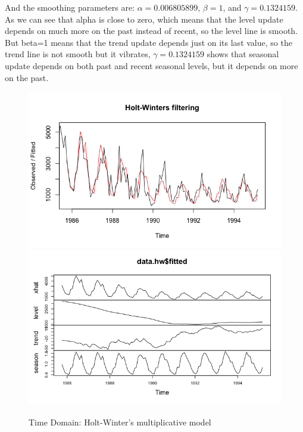 \documentclass[journal, a4paper]{IEEEtran}
\begin{document}
And the smoothing parameters are: $\alpha=0.006805899$, $\beta=1$, and $\gamma = 0.1324159$. 
As we can see that alpha is close to zero, which means that the level update depends on much more on the past instead of recent, so the level line is smooth.  But beta=1 means that the trend update depends just on its last value, so the trend line is not smooth but it vibrates, $\gamma=0.1324159$ shows that seasonal update depends on both past and recent seasonal levels, but it depends on more on the past. 

\begin{figure}[H]
\begin{center}
\includegraphics[scale=0.25]{fig1/data_hw_plot.png}
\includegraphics[scale=0.24]{fig1/data_hw_fitted.png}
\caption{Time Domain: Holt-Winter's multiplicative model}
\label{fig1:HW_model}
\end{center}
\end{figure}
\end{document}
